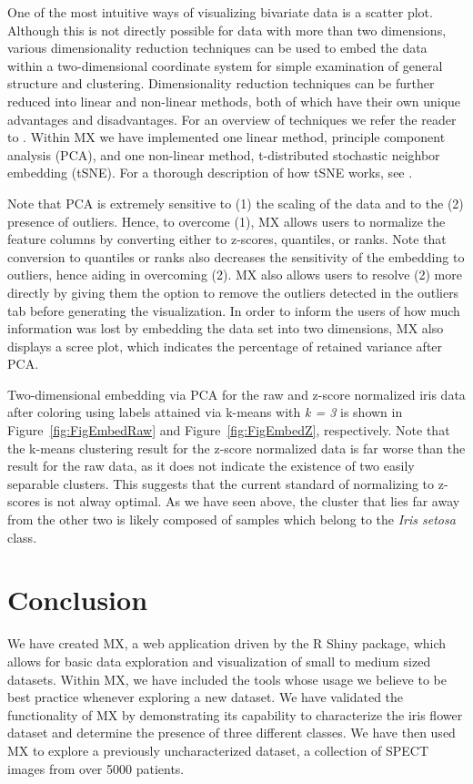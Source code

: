 \documentclass[12pt]{article}
\begin{document}
One of the most intuitive ways of visualizing bivariate data is a scatter plot. Although this is not directly possible for data with more than two dimensions, various dimensionality reduction techniques can be used to embed the data within a two-dimensional coordinate system for simple examination of general structure and clustering. Dimensionality reduction techniques can be further reduced into linear and non-linear methods, both of which have their own unique advantages and disadvantages. For an overview of techniques we refer the reader to \cite{van2009dimensionality}. Within MX we have implemented one linear method, principle component analysis (PCA), and one non-linear method, t-distributed stochastic neighbor embedding (tSNE). For a thorough description of how tSNE works, see \cite{van2008visualizing}.

Note that PCA is extremely sensitive to (1) the scaling of the data and to the (2) presence of outliers.  Hence, to overcome (1), MX allows users to normalize the feature columns by converting either to z-scores, quantiles, or ranks. Note that conversion to quantiles or ranks also decreases the sensitivity of the embedding to outliers, hence aiding in overcoming (2). MX also allows users to resolve (2) more directly by giving them the option to remove the outliers detected in the outliers tab before generating the visualization. In order to inform the users of how much information was lost by embedding the data set into two dimensions, MX also displays a scree plot, which indicates the percentage of retained variance after PCA. 

Two-dimensional embedding via PCA for the raw  and z-score normalized iris data after coloring using labels attained via k-means with \textit{k = 3} is shown in Figure~\ref{fig:FigEmbedRaw} and Figure~\ref{fig:FigEmbedZ}, respectively. Note that the k-means clustering result for the z-score normalized data is far worse than the result for the raw data, as it does not indicate the existence of two easily separable clusters. This suggests that the current standard of normalizing to z-scores is not alway optimal. As we have seen above, the cluster that lies far away from the other two is likely composed of samples which belong to the \textit{Iris setosa} class.

\section{Conclusion}
\label{sec:conc}

We have created MX, a web application driven by the R Shiny package, which allows for basic data exploration and visualization of small to medium sized datasets. Within MX, we have included the tools whose usage we believe to be best practice whenever exploring a new dataset. We have validated the functionality of MX by demonstrating its capability to characterize the iris flower dataset and determine the presence of three different classes. We have then used MX to explore a previously uncharacterized dataset, a collection of SPECT images from over 5000 patients.
\end{document}
